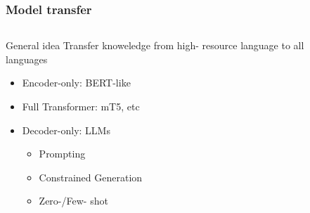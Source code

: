 \documentclass{beamer}
\begin{document}
\begin{frame}
  \frametitle{Model transfer}
  \begin{columns}[t]
    \begin{column}{0.5\textwidth}
      \begin{block}{General idea}
        Transfer knoweledge from high- resource language to
        all languages
      \end{block}

      \begin{itemize}
        \item Encoder-only: BERT-like
        \item Full Transformer: mT5, etc
        \item Decoder-only: LLMs
          \begin{itemize}
            \item Prompting
            \item Constrained Generation
            \item Zero-/Few- shot
          \end{itemize}
      \end{itemize}
    \end{column}
    \begin{column}{0.5\textwidth}  %
      \begin{table}
        \caption{Language distribution in pretraining data of the Llama2 with percentage above 0.005\%}
      \end{table}
    \end{column}
  \end{columns}
\end{frame}
\end{document}
